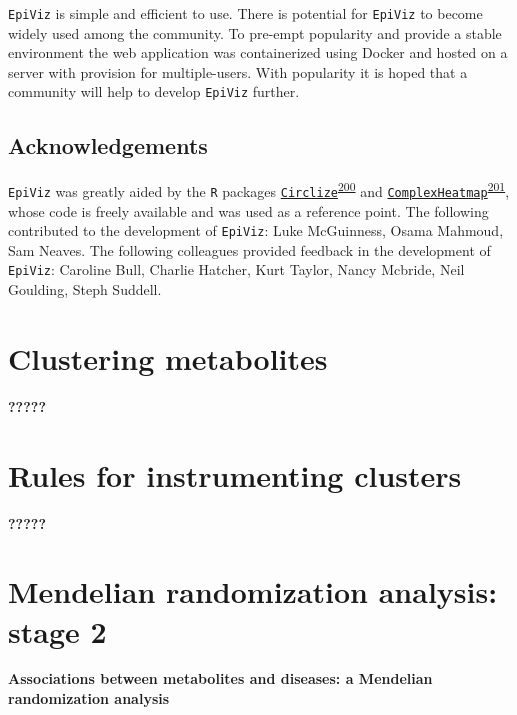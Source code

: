 \documentclass[11pt,twoside]{bristolthesis}
\begin{document}
\texttt{EpiViz} is simple and efficient to use. There is potential for \texttt{EpiViz} to become widely used among the community. To pre-empt popularity and provide a stable environment the web application was containerized using Docker and hosted on a server with provision for multiple-users. With popularity it is hoped that a community will help to develop \texttt{EpiViz} further.

\hypertarget{epiviz-acknowledgements}{%
\section{Acknowledgements}\label{epiviz-acknowledgements}}

\texttt{EpiViz} was greatly aided by the \texttt{R} packages \href{https://jokergoo.github.io/circlize_book/book/index.html}{\texttt{Circlize}}\textsuperscript{\protect\hyperlink{ref-Gu2014}{200}} and \href{https://jokergoo.github.io/ComplexHeatmap-reference/book/}{\texttt{ComplexHeatmap}}\textsuperscript{\protect\hyperlink{ref-Gu2016}{201}}, whose code is freely available and was used as a reference point. The following contributed to the development of \texttt{EpiViz}: Luke McGuinness, Osama Mahmoud, Sam Neaves. The following colleagues provided feedback in the development of \texttt{EpiViz}: Caroline Bull, Charlie Hatcher, Kurt Taylor, Nancy Mcbride, Neil Goulding, Steph Suddell.

\newpage

\hypertarget{chapter7}{%
\chapter{Clustering metabolites}\label{chapter7}}

\textbf{?????}

\hypertarget{chapter8}{%
\chapter{Rules for instrumenting clusters}\label{chapter8}}

\textbf{?????}

\hypertarget{chapter9}{%
\chapter{Mendelian randomization analysis: stage 2}\label{chapter9}}

\textbf{Associations between metabolites and diseases: a Mendelian randomization analysis}
\end{document}
